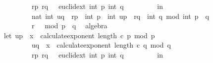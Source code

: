 \begin{isabellebody}
\ \ \ \ \ \ \ \ \ {\isacharparenleft}{\kern0pt}{\isacharparenleft}{\kern0pt}r{\isacharunderscore}{\kern0pt}p{\isacharcomma}{\kern0pt}\ r{\isacharunderscore}{\kern0pt}q{\isacharparenright}{\kern0pt}{\isacharcomma}{\kern0pt}\ {\isacharunderscore}{\kern0pt}{\isacharparenright}{\kern0pt}\ {\isacharequal}{\kern0pt}\ euclid{\isacharunderscore}{\kern0pt}ext\ {\isacharparenleft}{\kern0pt}int\ p{\isacharparenright}{\kern0pt}\ {\isacharparenleft}{\kern0pt}int\ q{\isacharparenright}{\kern0pt}\isanewline
\ \ \ \ \ \ \ \ \ in\isanewline
\ \ \ \ \ \ \ \ \ nat\ {\isacharparenleft}{\kern0pt}{\isacharparenleft}{\kern0pt}int\ u{\isacharunderscore}{\kern0pt}q\ {\isacharasterisk}{\kern0pt}\ r{\isacharunderscore}{\kern0pt}p\ {\isacharasterisk}{\kern0pt}\ int\ p\ {\isacharplus}{\kern0pt}\ int\ u{\isacharunderscore}{\kern0pt}p\ {\isacharasterisk}{\kern0pt}\ r{\isacharunderscore}{\kern0pt}q\ {\isacharasterisk}{\kern0pt}\ int\ q{\isacharparenright}{\kern0pt}\ mod\ int\ {\isacharparenleft}{\kern0pt}p\ {\isacharasterisk}{\kern0pt}\ q{\isacharparenright}{\kern0pt}{\isacharparenright}{\kern0pt}{\isacharparenright}{\kern0pt}\ {\isacharequal}{\kern0pt}\isanewline
\ \ \ \ \ \ \ \ \ r\ {\isacharcircum}{\kern0pt}\ {}\ mod\ {\isacharparenleft}{\kern0pt}p\ {\isacharasterisk}{\kern0pt}\ q{\isacharparenright}{\kern0pt}{\isachardoublequoteclose}\ \isamarkupfalse%
\ algebra\isanewline
\isanewline
\isanewline
\ \ \isamarkupfalse%
\ \isamarkupfalse%
\ {\isachardoublequoteopen}{\isacharparenleft}{\kern0pt}let\ u{\isacharunderscore}{\kern0pt}p\ {\isacharequal}{\kern0pt}\ x\ {\isacharcircum}{\kern0pt}\ calculate{\isacharunderscore}{\kern0pt}exponent\ {\isacharparenleft}{\kern0pt}length\ c{\isacharparenright}{\kern0pt}\ p\ mod\ p{\isacharsemicolon}{\kern0pt}\isanewline
\ \ \ \ \ \ \ \ \ u{\isacharunderscore}{\kern0pt}q\ {\isacharequal}{\kern0pt}\ x\ {\isacharcircum}{\kern0pt}\ calculate{\isacharunderscore}{\kern0pt}exponent\ {\isacharparenleft}{\kern0pt}length\ c{\isacharparenright}{\kern0pt}\ q\ mod\ q{\isacharsemicolon}{\kern0pt}\isanewline
\ \ \ \ \ \ \ \ \ {\isacharparenleft}{\kern0pt}{\isacharparenleft}{\kern0pt}r{\isacharunderscore}{\kern0pt}p{\isacharcomma}{\kern0pt}\ r{\isacharunderscore}{\kern0pt}q{\isacharparenright}{\kern0pt}{\isacharcomma}{\kern0pt}\ {\isacharunderscore}{\kern0pt}{\isacharparenright}{\kern0pt}\ {\isacharequal}{\kern0pt}\ euclid{\isacharunderscore}{\kern0pt}ext\ {\isacharparenleft}{\kern0pt}int\ p{\isacharparenright}{\kern0pt}\ {\isacharparenleft}{\kern0pt}int\ q{\isacharparenright}{\kern0pt}\isanewline
\ \ \ \ \ \ \ \ \ in\isanewline

\end{isabellebody}
